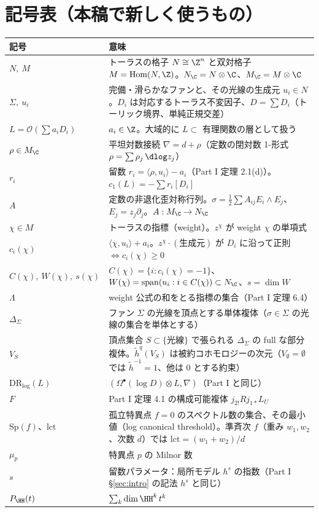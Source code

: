 \section{記号表（本稿で新しく使うもの）}\label{sec:notation}
\begin{longtable}{>{\raggedright\arraybackslash}p{3.6cm}>{\raggedright\arraybackslash}p{11.4cm}}
\toprule 記号 & 意味\\ \midrule\endhead
$N,\ M$ & トーラスの格子 $N\cong\Z^n$ と双対格子 $M=\mathrm{Hom}(N,\Z)$。$N_\C=N\otimes\C$、$M_\C=M\otimes\C$\\
$\Sigma,\ u_i$ & 完備・滑らかなファンと、その光線の生成元 $u_i\in N$。$D_i$ は対応するトーラス不変因子、$D=\sum D_i$（トーリック境界、単純正規交差）\\
$L=\mathcal O(\sum a_iD_i)$ & $a_i\in\Z$。大域的に $L\subset$ 有理関数の層として扱う\\
$\rho\in M_\C$ & 平坦対数接続 $\nabla=d+\rho$（定数の閉対数 1-形式 $\rho=\sum\rho_j\,\dlog z_j$）\\
$r_i$ & 留数 $r_i=\langle\rho,u_i\rangle-a_i$（Part I 定理 2.1(d)）。$c_1(L)=-\sum r_i[D_i]$\\
$A$ & 定数の非退化歪対称行列。$\sigma=\tfrac12\sum A_{ij}E_i\wedge E_j$、$E_j=z_j\partial_j$。$A:M_\C\to N_\C$\\
$\chi\in M$ & トーラスの指標（weight）。$z^\chi$ が weight $\chi$ の単項式\\
$c_i(\chi)$ & $\langle\chi,u_i\rangle+a_i$。$z^\chi\cdot(\text{生成元})$ が $D_i$ に沿って正則 $\Leftrightarrow c_i(\chi)\ge0$\\
$C(\chi),\ W(\chi),\ s(\chi)$ & $C(\chi)=\{i:c_i(\chi)=-1\}$、$W(\chi)=\mathrm{span}(u_i:i\in C(\chi))\subset N_\C$、$s=\dim W$\\
$\Lambda$ & weight 公式の和をとる指標の集合（Part I 定理 6.4）\\
$\Delta_\Sigma$ & ファン $\Sigma$ の光線を頂点とする単体複体（$\sigma\in\Sigma$ の光線の集合を単体とする）\\
$V_S$ & 頂点集合 $S\subset\{\text{光線}\}$ で張られる $\Delta_\Sigma$ の full な部分複体。$\tilde h^q(V_S)$ は被約コホモロジーの次元（$V_\emptyset=\emptyset$ では $\tilde h^{-1}=1$、他は 0 とする約束）\\
$\mathrm{DR}_{\log}(L)$ & $(\Omega^\bullet(\log D)\otimes L,\nabla)$（Part I と同じ）\\
$F$ & Part I 定理 4.1 の構成可能複体 $j_{2!}Rj_{1*}L_U$\\
$\mathrm{Sp}(f)$、$\mathrm{lct}$ & 孤立特異点 $f=0$ のスペクトル数の集合、その最小値（log canonical threshold）。準斉次 $f$（重み $w_1,w_2$、次数 $d$）では $\mathrm{lct}=(w_1+w_2)/d$\\
$\mu_p$ & 特異点 $p$ の Milnor 数\\
$s$ & 留数パラメータ：局所モデル $h^s$ の指数（Part I \S\ref{sec:intro} の記法 $h^s$ と同じ）\\
$P_{\HH}(t)$ & $\sum_k\dim\HH^k\,t^k$\\
\bottomrule
\end{longtable}
